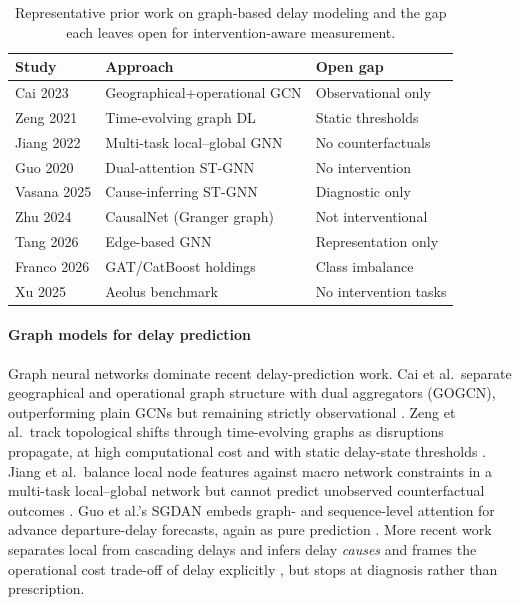 \documentclass[10pt,journal]{IEEEtran}
\begin{document}
\begin{table}[!t]
\centering
\small
\caption{Representative prior work on graph-based delay modeling and the gap
each leaves open for intervention-aware measurement.}
\label{tab:related}
\begin{tabular}{p{1.7cm}p{2.6cm}p{1.7cm}}
\toprule
Study & Approach & Open gap \\
\midrule
Cai 2023 \cite{cai2023} & Geographical+operational GCN & Observational only \\
Zeng 2021 \cite{zeng2021} & Time-evolving graph DL & Static thresholds \\
Jiang 2022 \cite{jiang2022} & Multi-task local--global GNN & No counterfactuals \\
Guo 2020 \cite{guo2020} & Dual-attention ST-GNN & No intervention \\
Vasana 2025 \cite{vasana2025} & Cause-inferring ST-GNN & Diagnostic only \\
Zhu 2024 \cite{zhu2024} & CausalNet (Granger graph) & Not interventional \\
Tang 2026 \cite{tang2026} & Edge-based GNN & Representation only \\
Franco 2026 \cite{franco2026} & GAT/CatBoost holdings & Class imbalance \\
Xu 2025 \cite{xu2025} & Aeolus benchmark & No intervention tasks \\
\bottomrule
\end{tabular}
\end{table}

\paragraph{Graph models for delay prediction}
Graph neural networks dominate recent delay-prediction work. Cai et al.\
separate geographical and operational graph structure with dual aggregators
(GOGCN), outperforming plain GCNs but remaining strictly observational
\cite{cai2023}. Zeng et al.\ track topological shifts through time-evolving
graphs as disruptions propagate, at high computational cost and with static
delay-state thresholds \cite{zeng2021}. Jiang et al.\ balance local node
features against macro network constraints in a multi-task local--global
network but cannot predict unobserved counterfactual outcomes \cite{jiang2022}.
Guo et al.'s SGDAN embeds graph- and sequence-level attention for advance
departure-delay forecasts, again as pure prediction \cite{guo2020}. More recent
work separates local from cascading delays and infers delay \emph{causes}
\cite{vasana2025} and frames the operational cost trade-off of delay explicitly
\cite{kim2024}, but stops at diagnosis rather than prescription.
\end{document}
